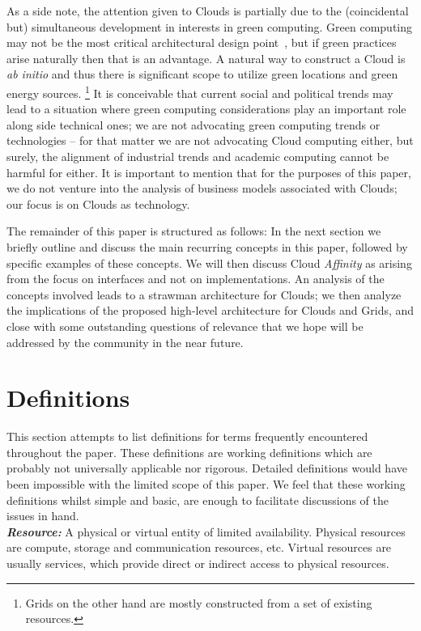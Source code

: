 \documentclass[conference,final]{IEEEtran}
\newcommand{\BI}[1]{\textbf{\textit{#1}}}
\begin{document}
 As a side note, the attention given to Clouds is partially due to the
 (coincidental but) simultaneous development in interests in green
 computing. Green computing may not be the most critical architectural
 design point~\cite{craiglee}, but if green practices arise naturally
 then that is an advantage. A natural way to construct a Cloud is {\it
 ab initio} and thus there is significant scope to utilize green
 locations and green energy sources. \footnote{Grids on the other hand
 are mostly constructed from a set of existing resources.}  It is
 conceivable that current social and political trends may lead to a
 situation where green computing considerations play an important role
 along side technical ones; we are not advocating green computing
 trends or technologies -- for that matter we are not advocating Cloud
 computing either, but surely, the alignment of industrial trends and
 academic computing cannot be harmful for either.  It is important to
 mention that for the purposes of this paper, we do not venture into
 the analysis of business models associated with Clouds; our focus is
 on Clouds as technology.

 The remainder of this paper is structured as follows: In the next
 section we briefly outline and discuss the main recurring concepts in
 this paper, followed by specific examples of these concepts.  We will
 then discuss Cloud {\it Affinity} as arising from the focus on
 interfaces and not on implementations. An analysis of the concepts
 involved leads to a strawman architecture for Clouds; we then analyze
 the implications of the proposed high-level architecture for Clouds
 and Grids, and close with some outstanding questions of relevance
 that we hope will be addressed by the community in the near future.

\section{Definitions}

 This section attempts to list definitions for terms frequently
 encountered throughout the paper.  These definitions are working
 definitions which are probably not universally applicable nor
 rigorous. Detailed definitions would have been impossible with the
 limited scope of this paper.  We feel that these working definitions
 whilst simple and basic, are enough to facilitate discussions of the
 issues in hand.\nocite{wikipedia}\\

 \BI{Resource:} A physical or virtual entity of limited availability.
 Physical resources are compute, storage and communication resources,
 etc.  Virtual resources are usually services, which provide direct or
 indirect access to physical resources.
\end{document}
